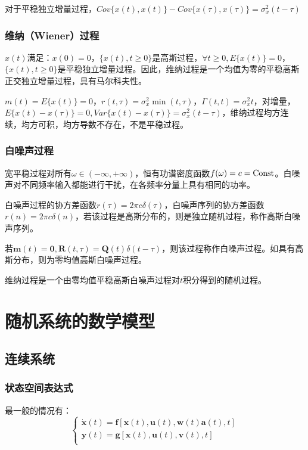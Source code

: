 \documentclass[11pt,a4paper]{ctexart}
\begin{document}
            对于平稳独立增量过程，$Cov\{x(t),x(t)\}-Cov\{x(\tau),x(\tau)\}=\sigma_x^2(t-\tau)$
        \subsubsection{维纳（Wiener）过程}
            $x(t)$满足：$x(0)=0$，$\{x(t),t\geqslant 0\}$是高斯过程，$\forall t\geqslant 0,E\{x(t)\}=0$，$\{x(t),t\geqslant0\}$是平稳独立增量过程。因此，维纳过程是一个均值为零的平稳高斯正交独立增量过程，具有马尔科夫性。

            $m(t)=E\{x(t)\}=0$，$r(t,\tau)=\sigma_x^2\min(t,\tau)$，$\varGamma(t,t)=\sigma_x^2t$，对增量，$E\{x(t)-x(\tau)\}=0,Var\{x(t)-x(\tau)\}=\sigma_x^2(t-\tau)$，维纳过程均方连续，均方可积，均方导数不存在，不是平稳过程。
        \subsubsection{白噪声过程}
            宽平稳过程对所有$\omega\in(-\infty,+\infty)$，恒有功谱密度函数$f(\omega)=c={\rm Const}$。白噪声对不同频率输入都能进行干扰，在各频率分量上具有相同的功率。

            白噪声过程的协方差函数$r(\tau)=2\pi c\delta(\tau)$，白噪声序列的协方差函数$r(n)=2\pi c\delta(n)$，若该过程是高斯分布的，则是独立随机过程，称作高斯白噪声序列。

            若$\bm{m}(t)=\bm{0},\bm{R}(t,\tau)=\bm{Q}(t)\delta(t-\tau)$，则该过程称作白噪声过程。如具有高斯分布，则为零均值高斯白噪声过程。

            维纳过程是一个由零均值平稳高斯白噪声过程对$t$积分得到的随机过程。
\newpage
\section{随机系统的数学模型}
    \subsection{连续系统}
        \subsubsection{状态空间表达式}
            最一般的情况有：
            \[
            \begin{cases}
            \bm{\dot x}(t)=\bm{f}[\bm{x}(t),\bm{u}(t),\bm{w}(t)\bm{a}(t),t]\\
            \bm{y}(t)=\bm{g}[\bm{x}(t),\bm{u}(t),\bm{v}(t),t]\\
            \end{cases}
            \]
            
\end{document}
